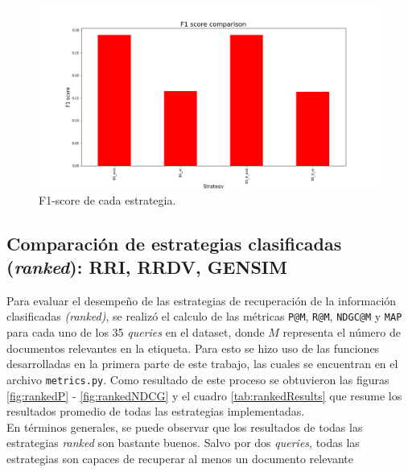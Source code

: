 \begin{figure}[H]
    \centering
    \includegraphics[width=\textwidth]{results/images/BS_f1_comparison.png}
    \caption{F1-score de cada estrategia.}
    \label{fig:F1-score}
\end{figure}


\subsection{Comparación de estrategias clasificadas (\textit{ranked}): RRI, RRDV, GENSIM}

Para evaluar el desempeño de las estrategias de recuperación de la información clasificadas \textit{(ranked)}, se realizó el calculo de las métricas \texttt{P@M}, \texttt{R@M}, \texttt{NDGC@M} y \texttt{MAP} para cada uno de los 35 \textit{queries} en el dataset, donde $M$ representa el número de documentos relevantes en la etiqueta. Para esto se hizo uso de las funciones desarrolladas en la primera parte de este trabajo, las cuales se encuentran en el archivo \texttt{metrics.py}. Como resultado de este proceso se obtuvieron las figuras \ref{fig:rankedP} - \ref{fig:rankedNDCG} y el cuadro \ref{tab:rankedResults} que resume los resultados promedio de todas las estrategias implementadas. \\

En términos generales, se puede observar que los resultados de todas las estrategias \textit{ranked} son bastante buenos. Salvo por dos \textit{queries}, todas las estrategias son capaces de recuperar al menos un documento relevante

